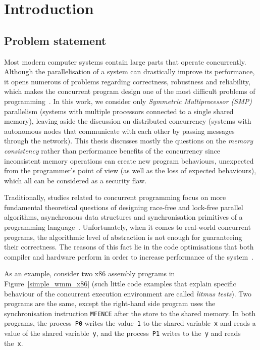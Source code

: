 \chapter{Introduction}
\label{ch:intro}


\section{Problem statement}
\label{ch:intro:problem}

Most modern computer systems contain large parts that operate concurrently.
Although the parallelisation of a system can drastically improve its performance, it opens numerous of problems regarding correctness, robustness and reliability, which makes the concurrent program design one of the most difficult problems of programming~\cite{mckenney2017parallel}.
In this work, we consider only \textit{Symmetric Multiprocessor (SMP)} parallelism (systems with multiple processors connected to a single shared memory), leaving aside the discussion on distributed concurrency (systems with autonomous nodes that communicate with each other by passing messages through the network).
This thesis discusses mostly the questions on the \textit{memory consistency} rather than performance benefits of the concurrency since inconsistent memory operations can create new program behaviours, unexpected from the programmer's point of view (as well as the loss of expected behaviours), which all can be considered as a security flaw.

Traditionally, studies related to concurrent programming focus on more fundamental theoretical questions of designing race-free and lock-free parallel algorithms, asynchronous data structures and synchronisation primitives of a programming language~\cite{ben2006principles}.
Unfortunately, when it comes to real-world concurrent programs, the algorithmic level of abstraction is not enough for guaranteeing their correctness.
The reasons of this fact lie in the code optimisations that both compiler and hardware perform in order to increase performance of the system~\cite{adve1996shared}.

As an example, consider two x86 assembly programs in Figure~\ref{simple_wmm_x86} (such little code examples that explain specific behaviour of the concurrent execution environment are called \textit{litmus tests}).
Two programs are the same, except the right-hand side program uses the synchronisation instruction \texttt{MFENCE} after the store to the shared memory.
In both programs, the process~\texttt{P0} writes the value~\texttt{1} to the shared variable~\texttt{x} and reads a value of the shared variable~\texttt{y}, and the process~\texttt{P1} writes to the~\texttt{y} and reads the~\texttt{x}.

